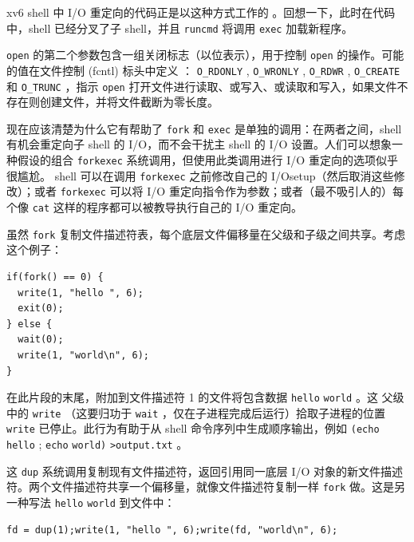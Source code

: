 \documentclass[UTF8]{article}
\begin{document}
xv6 shell 中 I/O 重定向的代码正是以这种方式工作的
        。回想一下，此时在代码中，shell 已经分叉了子 shell，并且
    \lstinline{runcmd}    将调用
    \lstinline{exec}    加载新程序。  

   \lstinline{open}    的第二个参数包含一组关闭标志（以位表示），用于控制    \lstinline{open}    的操作。可能的值在文件控制 (fcntl) 标头中定义
       ：
    \lstinline{O_RDONLY}    ,
    \lstinline{O_WRONLY}    ,
    \lstinline{O_RDWR}    ,
    \lstinline{O_CREATE}    和
    \lstinline{O_TRUNC}    ，指示    \lstinline{open}    打开文件进行读取、或写入、或读取和写入，如果文件不存在则创建文件，并将文件截断为零长度。  

现在应该清楚为什么它有帮助了
    \lstinline{fork}    和
    \lstinline{exec}    是单独的调用：在两者之间，shell 有机会重定向子 shell 的 I/O，而不会干扰主 shell 的 I/O 设置。人们可以想象一种假设的组合
    \lstinline{forkexec}    系统调用，但使用此类调用进行 I/O 重定向的选项似乎很尴尬。 shell 可以在调用    \lstinline{forkexec}    之前修改自己的 I/Osetup（然后取消这些修改）；或者
    \lstinline{forkexec}    可以将 I/O 重定向指令作为参数；或者（最不吸引人的）每个像    \lstinline{cat}    这样的程序都可以被教导执行自己的 I/O 重定向。  

虽然
    \lstinline{fork}    复制文件描述符表，每个底层文件偏移量在父级和子级之间共享。考虑这个例子：
    \begin{lstlisting}[]if(fork() == 0) {
  write(1, "hello ", 6);
  exit(0);
} else {
  wait(0);
  write(1, "world\n", 6);
}
\end{lstlisting}    在此片段的末尾，附加到文件描述符 1 的文件将包含数据
    \lstinline{hello}   
    \lstinline{world}    。这
 父级中的    \lstinline{write}    （这要归功于
    \lstinline{wait}   ，仅在子进程完成后运行）拾取子进程的位置
    \lstinline{write}    已停止。此行为有助于从 shell 命令序列中生成顺序输出，例如
    \lstinline{(echo}   
    \lstinline{hello}   ;
    \lstinline{echo}   
    \lstinline{world)}   
    \lstinline{>output.txt}    。  

这
    \lstinline{dup}    系统调用复制现有文件描述符，返回引用同一底层 I/O 对象的新文件描述符。两个文件描述符共享一个偏移量，就像文件描述符复制一样
    \lstinline{fork}    做。这是另一种写法
    \lstinline{hello}   
    \lstinline{world}    到文件中：
    \begin{lstlisting}[]fd = dup(1);write(1, "hello ", 6);write(fd, "world\n", 6);
\end{lstlisting}     
\end{document}
